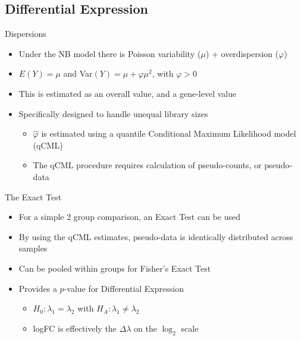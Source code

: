 \documentclass[aspectratio=169,11pt]{beamer}
\begin{document}
\subsection{Differential Expression}

\begin{frame}{Dispersions}

	\begin{itemize}
		\item Under the NB model there is Poisson variability ($\mu$) + overdispersion ($\varphi$)
		\item $E(Y) = \mu$ and Var$(Y) = \mu + \varphi\mu^2$, with $\varphi > 0$
		\item This is estimated as an overall value, and a gene-level value
		\item Specifically designed to handle unequal library sizes
		\begin{itemize}
			\item $\hat{\varphi}$ is estimated using a quantile Conditional Maximum Likelihood model (qCML)
			\item The qCML procedure requires calculation of pseudo-counts, or pseudo-data
		\end{itemize}
	\end{itemize}

\end{frame}

\begin{frame}{The Exact Test}

	\begin{itemize}
		\item For a simple 2 group comparison, an Exact Test can be used
		\item By using the qCML estimates, pseudo-data is identically distributed across samples
		\item Can be pooled within groups for Fisher's Exact Test
		\item Provides a $p$-value for Differential Expression
		\begin{itemize}
			\item $H_0: \lambda_1 = \lambda_2$ with $H_A: \lambda_1 \neq \lambda_2$
			\item logFC is effectively the $\Delta\lambda$ on the $\log_2$ scale
		\end{itemize}
	\end{itemize}

\end{frame}
\end{document}
